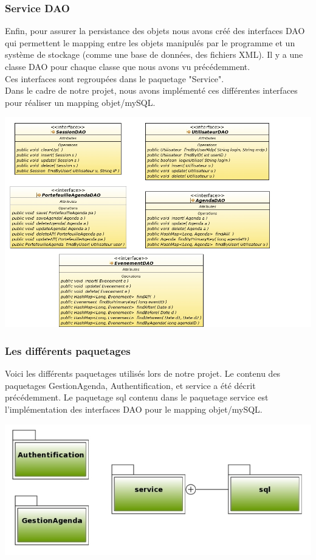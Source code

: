\documentclass[12pt , a4paper]{article}
\begin{document}
\newpage
\subsubsection{Service DAO}
\noindent Enfin, pour assurer la persistance des objets  nous avons créé des interfaces DAO qui permettent le mapping entre les objets manipulés par  le programme et un système de stockage (comme une
base de données, des fichiers XML). Il y a une classe DAO pour chaque classe que nous avons vu précédemment.\\
Ces interfaces sont regroupées dans le paquetage "Service".\\
Dans le cadre de notre projet, nous avons implémenté ces différentes interfaces pour réaliser un mapping objet/mySQL.
\begin{center}
  \includegraphics[scale=0.5]{./images/class_diagram_DAO.jpg}
\end{center}

\newpage
\subsubsection{Les différents paquetages}
\noindent Voici les différents paquetages utilisés lors de notre projet. Le contenu des  paquetages GestionAgenda, Authentification, et service a été décrit précédemment. Le paquetage sql contenu dans
le paquetage service est l'implémentation des interfaces DAO pour le mapping objet/mySQL.
\begin{center}
  \includegraphics[scale=0.5]{./images/paquetages.jpg}
\end{center}
\end{document}
